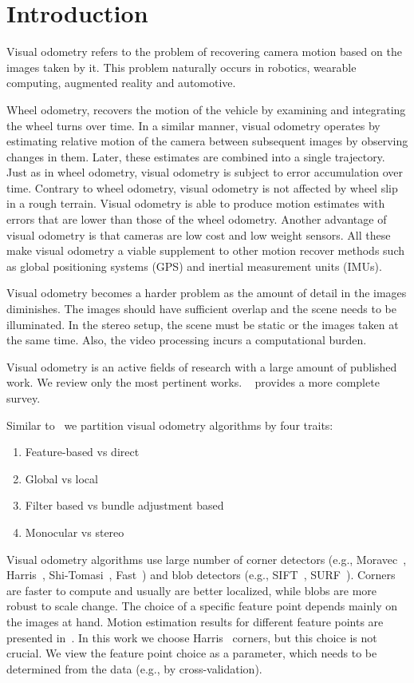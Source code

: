 

\chapter{Introduction}
\label{chap:intro}

Visual odometry refers to the problem of recovering camera motion
based on the images taken by it. This problem naturally occurs in
robotics, wearable computing, augmented reality and automotive.

Wheel odometry, recovers the motion of the vehicle by examining and
integrating the wheel turns over time.  In a similar manner, visual
odometry operates by estimating relative motion of the camera between
subsequent images by observing changes in them. Later, these estimates
are combined into a single trajectory. Just as in wheel odometry,
visual odometry is subject to error accumulation over time. Contrary
to wheel odometry, visual odometry is not affected by wheel slip in a
rough terrain. Visual odometry is able to produce motion estimates
with errors that are lower than those of the wheel odometry. Another
advantage of visual odometry is that cameras are low cost and low
weight sensors.  All these make visual odometry a viable supplement to
other motion recover methods such as global positioning systems (GPS)
and inertial measurement units (IMUs).

Visual odometry becomes a harder problem as the amount of detail in
the images diminishes. The images should have sufficient overlap and
the scene needs to be illuminated.  In the stereo setup, the scene
must be static or the images taken at the same time. Also, the video
processing incurs a computational burden.

Visual odometry is an active fields of research with a large amount of
published work.  We review only the most pertinent works.
~\cite{Scaramuzza2011} provides a more complete survey.

Similar to~\cite{Persson2015} we partition visual odometry algorithms
by four traits:
\begin{enumerate}
\item Feature-based vs direct
\item Global vs local
\item Filter based vs bundle adjustment based
\item Monocular vs stereo
\end{enumerate}

Visual odometry algorithms use large number of corner detectors
(e.g., Moravec~\cite{Moravec1980}, Harris~\cite{Harris1987},
Shi-Tomasi~\cite{Shi1994}, Fast~\cite{Rosten2006}) and blob detectors
(e.g., SIFT~\cite{Lowe2004}, SURF~\cite{Bay2006}). Corners are faster to
compute and usually are better localized, while blobs are more robust
to scale change. The choice of a specific feature point depends mainly
on the images at hand.  Motion estimation results for different
feature points are presented in~\cite{Govender2009}. In this work we
choose Harris~\cite{Harris1987} corners, but this choice is not
crucial. We view the feature point choice as a parameter, which needs
to be determined from the data (e.g., by cross-validation).

